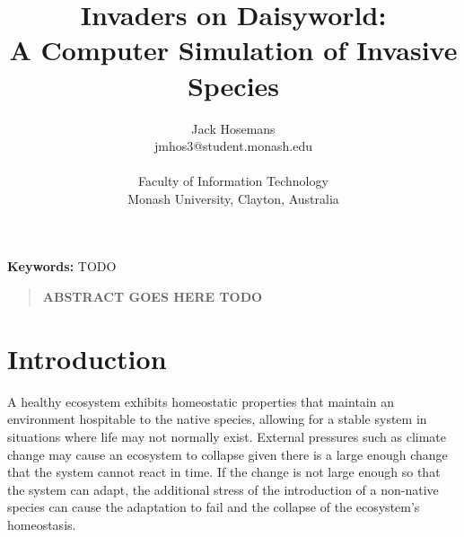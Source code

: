 \documentclass[12pt]{article}
\title{Invaders on Daisyworld:\\ A Computer Simulation of Invasive Species}
\author{
  Jack Hosemans\\
  \normalsize{jmhos3@student.monash.edu}\\
  \\
  \normalsize{Faculty of Information Technology}\\
  \normalsize{Monash University, Clayton, Australia}
}
\date{}
\makeatletter
\renewcommand\paragraph{\@startsection{paragraph}{4}{\z@}%
            {-2.5ex\@plus -1ex \@minus -.25ex}%
            {1.25ex \@plus .25ex}%
            {\normalfont\normalsize\bfseries}}
\newenvironment{sciabstract}{%
\begin{quote} \bf}
{\end{quote}}
\makeatother
\begin{document}
 

\baselineskip24pt


\maketitle 

{\bf \quad Keywords:} TODO


\begin{sciabstract}
ABSTRACT GOES HERE TODO
\end{sciabstract}




\section{Introduction}
A healthy ecosystem exhibits homeostatic properties\cite{morgan2001}
that maintain an environment hospitable to the native species,
allowing for a stable system in situations where life may not normally
exist. External pressures such as climate change may cause an
ecosystem to collapse given there is a large enough change that the
system cannot react in time\cite{barry2014}. If the change is not
large enough so that the system can adapt, the additional stress of the
introduction of a non-native species can cause the adaptation to fail
and the collapse of the ecosystem's homeostasis\cite{rapport1985}.
\end{document}
